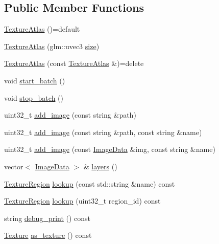 \subsection*{Public Member Functions}
\begin{DoxyCompactItemize}
\item 
\hyperlink{classpixel_1_1graphics_1_1_texture_atlas_a68a1861adafd58e2de2f498bee77330e}{Texture\+Atlas} ()=default
\item 
\hyperlink{classpixel_1_1graphics_1_1_texture_atlas_a00f05393abe8684c4bc32b0d11f3e740}{Texture\+Atlas} (glm\+::uvec3 \hyperlink{namespacepixel_a465745e3b1a334686475c629948876f0}{size})
\item 
\hyperlink{classpixel_1_1graphics_1_1_texture_atlas_a113cf007b650a4f60a7bc5126cb550f1}{Texture\+Atlas} (const \hyperlink{classpixel_1_1graphics_1_1_texture_atlas}{Texture\+Atlas} \&)=delete
\item 
void \hyperlink{classpixel_1_1graphics_1_1_texture_atlas_aa188b1c03218f98cfc50359d99befd1c}{start\+\_\+batch} ()
\item 
void \hyperlink{classpixel_1_1graphics_1_1_texture_atlas_a8c415166d2c7249f400922ae5d8062cc}{stop\+\_\+batch} ()
\item 
uint32\+\_\+t \hyperlink{classpixel_1_1graphics_1_1_texture_atlas_aa770adaedaaa807eaba9298043c46f62}{add\+\_\+image} (const string \&path)
\item 
uint32\+\_\+t \hyperlink{classpixel_1_1graphics_1_1_texture_atlas_aa8a47584c01d7956aa8e2178ff94f81e}{add\+\_\+image} (const string \&path, const string \&name)
\item 
uint32\+\_\+t \hyperlink{classpixel_1_1graphics_1_1_texture_atlas_a2b2e1506e71188db282c33aa2defc71d}{add\+\_\+image} (const \hyperlink{structpixel_1_1graphics_1_1_image_data}{Image\+Data} \&img, const string \&name)
\item 
vector$<$ \hyperlink{structpixel_1_1graphics_1_1_image_data}{Image\+Data} $>$ \& \hyperlink{classpixel_1_1graphics_1_1_texture_atlas_ad136be893ba018ccd08e735371c8550a}{layers} ()
\item 
\hyperlink{structpixel_1_1graphics_1_1_texture_region}{Texture\+Region} \hyperlink{classpixel_1_1graphics_1_1_texture_atlas_abd874960bb38b9c7fe3a935122a4828e}{lookup} (const std\+::string \&name) const
\item 
\hyperlink{structpixel_1_1graphics_1_1_texture_region}{Texture\+Region} \hyperlink{classpixel_1_1graphics_1_1_texture_atlas_a2fe6502940cde38bc47cbe7f29d6f0c8}{lookup} (uint32\+\_\+t region\+\_\+id) const
\item 
string \hyperlink{classpixel_1_1graphics_1_1_texture_atlas_abd450c2c9d3b37d750dcf797eeb5f315}{debug\+\_\+print} () const
\item 
\hyperlink{classpixel_1_1graphics_1_1_texture}{Texture} \hyperlink{classpixel_1_1graphics_1_1_texture_atlas_af54a81d380abe7a8faec3e148215f9c4}{as\+\_\+texture} () const
\end{DoxyCompactItemize}
